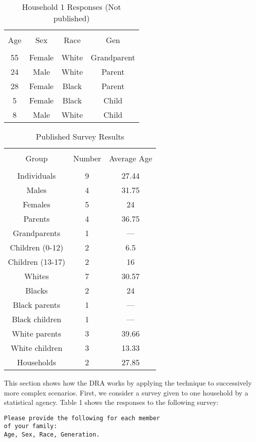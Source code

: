 \documentclass[jou,apacite]{apa6}
\begin{document}
\begin{table}[b]
\caption{Household 1 Responses (Not published)}\label{tab1}
\begin{tabular}{cccc}
\hline\\[-1.5ex]
Age & Sex & Race & Gen \\[0.5ex]
\hline\\[-1.5ex]
55 & Female & White & Grandparent\\[0.5ex]
24 & Male & White & Parent\\[0.5ex]
28 & Female & Black & Parent\\[0.5ex]
5 & Female & Black & Child\\[0.5ex]
8 & Male & White & Child\\[0.5ex]
\hline
\end{tabular}
\end{table}

\begin{table}[h]
\caption{Published Survey Results}\label{tab2}
\begin{tabular}{ccc}
\hline\\[-1.5ex]
Group & Number & Average Age \\[0.25ex]
\hline\\[-1.5ex]
Individuals & 9 & 27.44 \\[0.25ex]
Males & 4 & 31.75 \\[0.25ex]
Females & 5 & 24 \\[0.25ex]
Parents & 4 & 36.75 \\[0.25ex]
Grandparents & 1 & --- \\[0.25ex]
Children (0-12) & 2 & 6.5 \\[0.25ex]
Children (13-17) & 2 & 16 \\[0.25ex]
Whites & 7 & 30.57 \\[0.25ex]
Blacks & 2 & 24 \\[0.25ex]
Black parents & 1 & --- \\[0.25ex]
Black children & 1 & ---\\[0.25ex]
White parents & 3 & 39.66 \\[0.25ex]
White children & 3 & 13.33 \\[0.25ex]
Households & 2 & 27.85 \\[0.25ex]
\hline
\end{tabular}
\end{table}

This section shows how the DRA works by applying the technique to successively more complex scenarios. First, we consider a survey given to one household by a statistical agency. Table 1 shows the responses to the following survey:
\begin{verbatim}
Please provide the following for each member
of your family:
Age, Sex, Race, Generation.
\end{verbatim}
\end{document}
